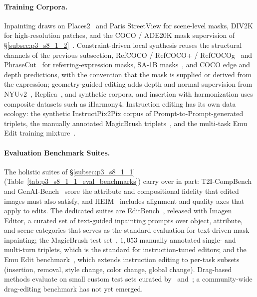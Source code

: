 \paragraph{Training Corpora.}
Inpainting draws on Places2~\cite{zhou2017places} and Paris StreetView for scene-level masks, DIV2K for high-resolution patches, and the COCO / ADE20K mask supervision of §\ref{subsec:p3_s8_1_2}~\cite{lin2014microsoft,zhou2017ade20k}.
Constraint-driven local synthesis reuses the structural channels of the previous subsection, RefCOCO / RefCOCO+ / RefCOCOg~\cite{yu2016modeling} and PhraseCut~\cite{wu2020phrasecut} for referring-expression masks, SA-1B masks~\cite{kirillov2023sam}, and COCO edge and depth predictions, with the convention that the mask is supplied or derived from the expression; geometry-guided editing adds depth and normal supervision from NYUv2~\cite{silberman2012nyudv2}, Replica~\cite{straub2019replica}, and synthetic corpora, and insertion with harmonization uses composite datasets such as iHarmony4.
Instruction editing has its own data ecology: the synthetic InstructPix2Pix corpus of Prompt-to-Prompt-generated triplets, the manually annotated MagicBrush triplets~\cite{zhang2024magicbrush}, and the multi-task Emu Edit training mixture~\cite{sheynin2024emu}.

\paragraph{Evaluation Benchmark Suites.}
The holistic suites of §\ref{subsec:p3_s8_1_1} (Table~\ref{tab:p3_s8_1_1_eval_benchmarks}) carry over in part: T2I-CompBench~\cite{huang2023t2icompbench} and GenAI-Bench~\cite{li2024genaibench} score the attribute and compositional fidelity that edited images must also satisfy, and HEIM~\cite{lee2023heim} includes alignment and quality axes that apply to edits.
The dedicated suites are EditBench~\cite{wang2023editbench}, released with Imagen Editor, a curated set of text-guided inpainting prompts over object, attribute, and scene categories that serves as the standard evaluation for text-driven mask inpainting; the MagicBrush test set~\cite{zhang2024magicbrush}, $1{,}053$ manually annotated single- and multi-turn triplets, which is the standard for instruction-tuned editors; and the Emu Edit benchmark~\cite{sheynin2024emu}, which extends instruction editing to per-task subsets (insertion, removal, style change, color change, global change).
Drag-based methods evaluate on small custom test sets curated by~\citet{pan2023draggan} and~\citet{shi2023dragdiffusion}; a community-wide drag-editing benchmark has not yet emerged.

